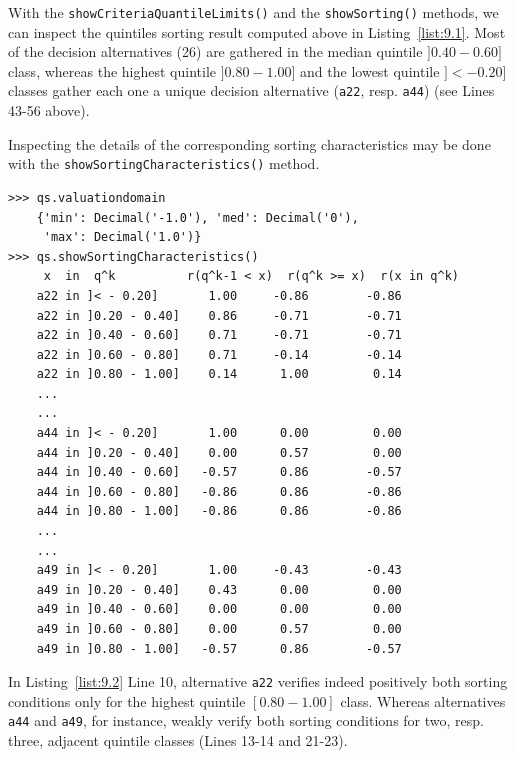 With the \texttt{showCriteriaQuantileLimits()} and the \texttt{showSorting()} methods, we can inspect the quintiles sorting result computed above in Listing~\vref{list:9.1}. Most of the decision alternatives (26) are gathered in the median quintile $]0.40 - 0.60]$ class, whereas the highest quintile $]0.80-1.00]$ and the lowest quintile $]< - 0.20]$ classes gather each one a unique decision alternative (\texttt{a22}, resp. \texttt{a44}) (see Lines 43-56 above).

Inspecting the details of the corresponding sorting characteristics may be done with the \texttt{showSortingCharacteristics()} method.
\begin{lstlisting}[caption={Bipolar-valued sorting characteristics (extract)},label=list:9.2]
>>> qs.valuationdomain
    {'min': Decimal('-1.0'), 'med': Decimal('0'),
     'max': Decimal('1.0')}
>>> qs.showSortingCharacteristics()
     x  in  q^k          r(q^k-1 < x)  r(q^k >= x)  r(x in q^k)
    a22 in ]< - 0.20]	    1.00	 -0.86	      -0.86
    a22 in ]0.20 - 0.40]    0.86	 -0.71	      -0.71
    a22 in ]0.40 - 0.60]    0.71	 -0.71	      -0.71
    a22 in ]0.60 - 0.80]    0.71	 -0.14	      -0.14
    a22 in ]0.80 - 1.00]    0.14	  1.00	       0.14
    ...
    ...
    a44 in ]< - 0.20]	    1.00	  0.00	       0.00
    a44 in ]0.20 - 0.40]    0.00	  0.57	       0.00
    a44 in ]0.40 - 0.60]   -0.57	  0.86	      -0.57
    a44 in ]0.60 - 0.80]   -0.86	  0.86	      -0.86
    a44 in ]0.80 - 1.00]   -0.86	  0.86	      -0.86
    ...
    ...
    a49 in ]< - 0.20]	    1.00	 -0.43	      -0.43
    a49 in ]0.20 - 0.40]    0.43	  0.00	       0.00
    a49 in ]0.40 - 0.60]    0.00	  0.00	       0.00
    a49 in ]0.60 - 0.80]    0.00	  0.57	       0.00
    a49 in ]0.80 - 1.00]   -0.57	  0.86	      -0.57
\end{lstlisting}

In Listing~\vref{list:9.2} Line 10, alternative \texttt{a22} verifies indeed positively both sorting conditions only for the highest quintile $[0.80 - 1.00]$ class. Whereas alternatives \texttt{a44} and \texttt{a49}, for instance, weakly verify both sorting conditions for two, resp. three, adjacent quintile classes (Lines 13-14 and 21-23).  

